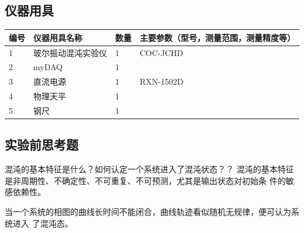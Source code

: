 \documentclass[dvipsnames, svgnames,a4paper,11pt]{article}
\begin{document}
\subsection{仪器用具}
\begin{table}[htbp]
	\centering
	\renewcommand\arraystretch{1.6}
	\begin{tabular}{p{}|p{}|p{}|p{}}
	\hline
	编号& 仪器用具名称 & 数量 &  主要参数（型号，测量范围，测量精度等） \\
	\hline
	1&玻尔振动混沌实验仪&1 &COC-JCHD\\
	\hline
	2&myDAQ  &1&\\
	\hline
	3&直流电源 & 1 &RXN-1502D \\
	\hline
	4&物理天平&1 &  \\
	\hline
	5& 钢尺&1& \\
	\hline
\end{tabular}
\end{table}

\subsection{实验前思考题}
\begin{question}
	混沌的基本特征是什么？如何认定一个系统进入了混沌状态？？
	\tcblower
	混沌的基本特征是非周期性、不确定性、不可重复、不可预测，尤其是输出状态对初始条
件的敏感依赖性。

    当一个系统的相图的曲线长时间不能闭合，曲线轨迹看似随机无规律，便可认为系统进入
了混沌态。
\end{question}
\end{document}
